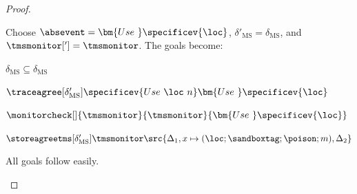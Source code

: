 \documentclass[a4paper,names,dvipsnames]{article}
\begin{document}
\begin{proof}
\begin{description}
      Choose $\absevent=\bm{Use\ }\specificev{\loc}$, $\delta'_{\text{MS}}=\delta_{\text{MS}}$, and $\tmsmonitor[']=\tmsmonitor$.
      The goals become:
      \begin{goals}
        \item $\delta_{\text{MS}}\subseteq\delta_{\text{MS}}$
        \item $\traceagree[\delta_{\text{MS}}']{\specificev{Use\ \loc\ n}}{\bm{Use\ }\specificev{\loc}}$
        \item $\monitorcheck[]{\tmsmonitor}{\tmsmonitor}{\bm{Use\ }\specificev{\loc}}$
        \item $\storeagreetms[\delta_{\text{MS}}']{\tmsmonitor}{\src{\Delta_1,x\mapsto(\loc;\sandboxtag;\poison;m),\Delta_2}}$
      \end{goals}
      All goals follow easily.
  \end{description}
\end{proof}
\end{document}
